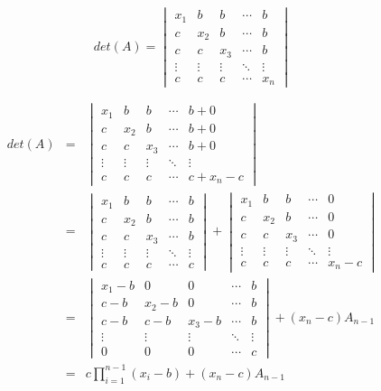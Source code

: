 \begin{proposition}[两三角形行列式]
	$$det(A) = \begin{vmatrix}
		x_{1}      & b      & b      & \cdots & b\\
		c          & x_{2}  & b      & \cdots & b\\
		c          & c      & x_{3}  & \cdots & b\\
		\vdots     & \vdots & \vdots & \ddots & \vdots\\
		c          & c      & c      & \cdots & x_{n}
	\end{vmatrix}$$

	\begin{eqnarray*}
		det(A) & = & 
		\begin{vmatrix}
			x_{1}      & b      & b      & \cdots & b + 0\\
			c          & x_{2}  & b      & \cdots & b + 0\\
			c          & c      & x_{3}  & \cdots & b + 0\\
			\vdots     & \vdots & \vdots & \ddots & \vdots\\
			c          & c      & c      & \cdots & c + x_{n} - c
		\end{vmatrix}\\
			  & = & 
		\begin{vmatrix}
			x_{1}      & b      & b      & \cdots & b \\
			c          & x_{2}  & b      & \cdots & b \\
			c          & c      & x_{3}  & \cdots & b \\
			\vdots     & \vdots & \vdots & \ddots & \vdots\\
			c          & c      & c      & \cdots & c
		\end{vmatrix} + 
		\begin{vmatrix}
			x_{1}      & b      & b      & \cdots & 0\\
			c          & x_{2}  & b      & \cdots & 0\\
			c          & c      & x_{3}  & \cdots & 0\\
			\vdots     & \vdots & \vdots & \ddots & \vdots\\
			c          & c      & c      & \cdots & x_{n} - c
		\end{vmatrix}\\
			& = & 
		\begin{vmatrix}
			x_{1}-b      & 0      & 0      & \cdots & b \\
			c-b          & x_{2}-b  & 0      & \cdots & b \\
			c-b          & c-b      & x_{3}-b  & \cdots & b \\
			\vdots     & \vdots & \vdots & \ddots & \vdots\\
			0          & 0      & 0      & \cdots & c 
		\end{vmatrix} + (x_{n} - c)A_{n-1} \\
			& = & c\prod\limits_{i=1}^{n-1}(x_{i}-b) + (x_{n} - c)A_{n-1}
	\end{eqnarray*}


\end{proposition}
